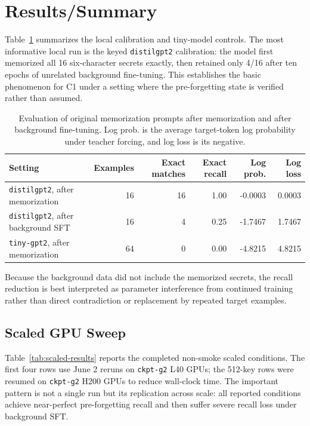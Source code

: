 \documentclass{article}
\begin{document}
\section{Results/Summary}

Table~\ref{tab:main-results} summarizes the local calibration and tiny-model controls. The most informative local run is the keyed \texttt{distilgpt2} calibration: the model first memorized all 16 six-character secrets exactly, then retained only 4/16 after ten epochs of unrelated background fine-tuning. This establishes the basic phenomenon for C1 under a setting where the pre-forgetting state is verified rather than assumed.

\begin{table}[h]
\centering
\small
\caption{Evaluation of original memorization prompts after memorization and after background fine-tuning. Log prob. is the average target-token log probability under teacher forcing, and log loss is its negative.}
\label{tab:main-results}
\begin{tabular}{lrrrrr}
\toprule
Setting & Examples & Exact matches & Exact recall & Log prob. & Log loss \\
\midrule
\texttt{distilgpt2}, after memorization & 16 & 16 & 1.00 & -0.0003 & 0.0003 \\
\texttt{distilgpt2}, after background SFT & 16 & 4 & 0.25 & -1.7467 & 1.7467 \\
\texttt{tiny-gpt2}, after memorization & 64 & 0 & 0.00 & -4.8215 & 4.8215 \\
\bottomrule
\end{tabular}
\end{table}

Because the background data did not include the memorized secrets, the recall reduction is best interpreted as parameter interference from continued training rather than direct contradiction or replacement by repeated target examples.

\subsection{Scaled GPU Sweep}

Table~\ref{tab:scaled-results} reports the completed non-smoke scaled conditions. The first four rows use June 2 reruns on \texttt{ckpt-g2} L40 GPUs; the 512-key rows were resumed on \texttt{ckpt-g2} H200 GPUs to reduce wall-clock time. The important pattern is not a single run but its replication across scale: all reported conditions achieve near-perfect pre-forgetting recall and then suffer severe recall loss under background SFT.
\end{document}
